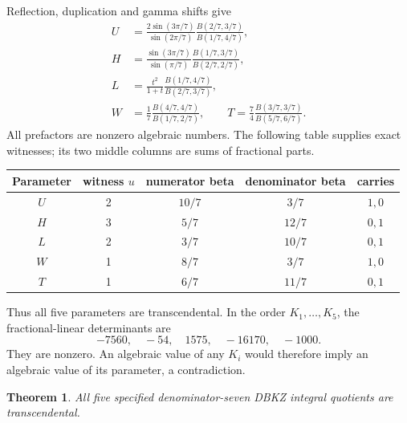 \documentclass[11pt,a4paper]{article}
\newtheorem{theorem}{Theorem}[section]
\theoremstyle{definition}
\theoremstyle{remark}
\numberwithin{equation}{section}
\begin{document}
Reflection, duplication and gamma shifts give
\begin{align*}
U&=\frac{2\sin(3\pi/7)}{\sin(2\pi/7)}
 \frac{B(2/7,3/7)}{B(1/7,4/7)},\\
H&=\frac{\sin(3\pi/7)}{\sin(\pi/7)}
 \frac{B(1/7,3/7)}{B(2/7,2/7)},\\
L&=\frac{t^2}{1+t}\frac{B(1/7,4/7)}{B(2/7,3/7)},\\
W&=\frac17\frac{B(4/7,4/7)}{B(1/7,2/7)},\qquad
T=\frac74\frac{B(3/7,3/7)}{B(5/7,6/7)}.
\end{align*}
All prefactors are nonzero algebraic numbers. The following table supplies
exact witnesses; its two middle columns are sums of fractional parts.
\begin{center}
\begin{tabular}{ccccc}
\toprule
Parameter & witness \(u\) & numerator beta & denominator beta & carries\\
\midrule
\(U\)&2&\(10/7\)&\(3/7\)&\(1,0\)\\
\(H\)&3&\(5/7\)&\(12/7\)&\(0,1\)\\
\(L\)&2&\(3/7\)&\(10/7\)&\(0,1\)\\
\(W\)&1&\(8/7\)&\(3/7\)&\(1,0\)\\
\(T\)&1&\(6/7\)&\(11/7\)&\(0,1\)\\
\bottomrule
\end{tabular}
\end{center}
Thus all five parameters are transcendental. In the order \(K_1,\ldots,K_5\),
the fractional-linear determinants are
\[
-7560,\quad-54,\quad1575,\quad-16170,\quad-1000.
\]
They are nonzero. An algebraic value of any \(K_i\) would therefore imply
an algebraic value of its parameter, a contradiction.

\begin{theorem}
All five specified denominator-seven DBKZ integral quotients are
transcendental.
\end{theorem}
\end{document}
